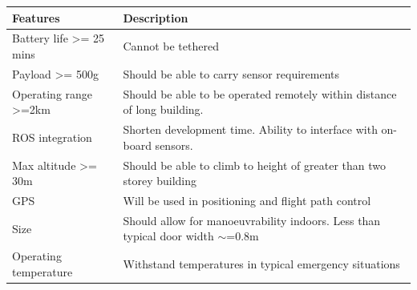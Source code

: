 \documentclass[capstone_report.tex]{subfiles}
\begin{document}
\begin{table}[H]
\centering
\label{final_requirements}
\begin{tabular}{p{6cm}p{8cm}}
\toprule
Features                           & Description                                                                         \\ \midrule
Battery life \textgreater= 25 mins & Cannot be tethered                                                                  \\
Payload \textgreater= 500g         & Should be able to carry sensor requirements                                         \\
Operating range \textgreater=2km   & Should be able to be operated remotely within distance of long building.            \\
ROS integration                    & Shorten development time.  Ability to interface with on-board sensors.              \\
Max altitude \textgreater= 30m     & Should be able to climb to height of greater than two storey building               \\
GPS                                & Will be used in positioning and flight path control                                 \\
Size                               & Should allow for manoeuvrability indoors.  Less than typical door width $\sim$=0.8m \\
Operating temperature              & Withstand temperatures in typical emergency situations                              \\ \bottomrule
\end{tabular}
\end{table}
\end{document}

